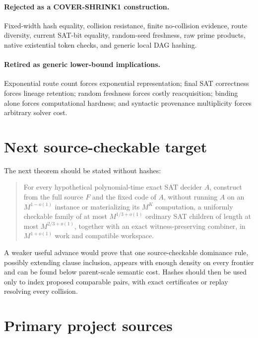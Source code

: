 \documentclass[11pt]{article}
\begin{document}
\paragraph{Rejected as a COVER-SHRINK1 construction.}
Fixed-width hash equality, collision resistance, finite no-collision evidence,
route diversity, current SAT-bit equality, random-seed freshness, raw prime
products, native existential token checks, and generic local DAG hashing.

\paragraph{Retired as generic lower-bound implications.}
Exponential route count forces exponential representation; final SAT
correctness forces lineage retention; random freshness forces costly
reacquisition; binding alone forces computational hardness; and syntactic
provenance multiplicity forces arbitrary solver cost.

\section{Next source-checkable target}

The next theorem should be stated without hashes:

\begin{quote}
For every hypothetical polynomial-time exact SAT decider $A$, construct from
the full source $F$ and the fixed code of $A$, without running $A$ on an
$M^{1-o(1)}$ instance or materializing its $M^K$ computation, a uniformly
checkable family of at most $M^{1/3+o(1)}$ ordinary SAT children of length at
most $M^{2/3+o(1)}$, together with an exact witness-preserving combiner, in
$M^{1+o(1)}$ work and compatible workspace.
\end{quote}

A weaker useful advance would prove that one source-checkable dominance rule,
possibly extending clause inclusion, appears with enough density on every
frontier and can be found below parent-scale semantic cost.  Hashes should then
be used only to index proposed comparable pairs, with exact certificates or
replay resolving every collision.

\section{Primary project sources}\label{sec:sources}
\end{document}
